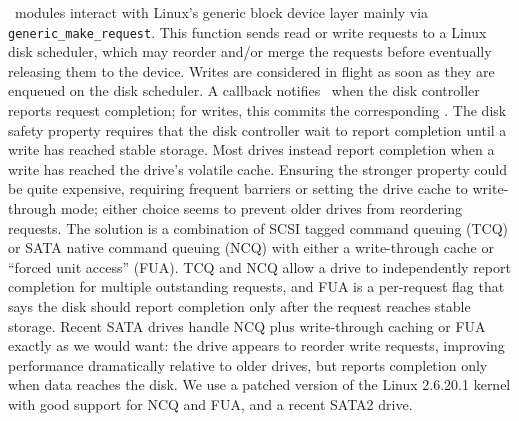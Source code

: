 \Kudos\ modules interact with Linux's generic block device layer mainly via
\verb+generic_make_request+.
%
This function sends read or write requests to a Linux disk scheduler, which
may reorder and/or merge the requests before eventually releasing them to
the device.
%
Writes are considered in flight as soon as they are enqueued on the disk
scheduler.
%
A callback notifies \Kudos\ when the disk controller reports request
completion; for writes, this commits the corresponding \patches.
%
The disk safety property requires that the disk controller wait to report
completion until a write has reached stable storage.
%
Most drives instead report completion when a write has reached the drive's
volatile cache.
%
Ensuring the stronger property could be quite expensive, requiring frequent
barriers or setting the drive cache to write-through mode; either choice
seems to prevent older drives from reordering requests.
%
The solution is a combination of SCSI tagged command queuing (TCQ) or SATA
native command queuing (NCQ) with either a write-through cache or ``forced
unit access'' (FUA).
%
TCQ and NCQ allow a drive to independently report completion for multiple
outstanding requests, and FUA is a per-request flag that says the disk
should report completion only after the request reaches stable storage.
%
Recent SATA drives handle NCQ plus write-through caching or FUA exactly as
we would want: the drive appears to reorder write requests, improving
performance dramatically relative to older drives, but reports completion
only when data reaches the disk.
%
We use a patched version of the Linux 2.6.20.1 kernel with good support for
NCQ and FUA, and a recent SATA2 drive.


